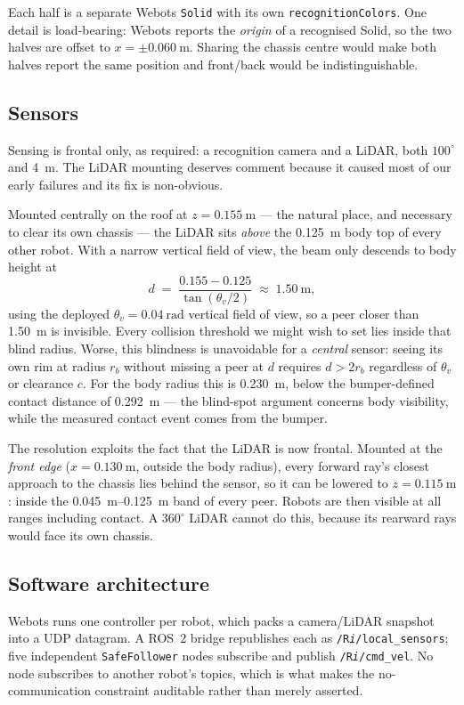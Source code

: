 \documentclass[conference,a4paper]{IEEEtran}
\begin{document}
Each half is a separate Webots \texttt{Solid} with its own
\texttt{recognitionColors}. One detail is load-bearing: Webots reports the
\emph{origin} of a recognised Solid, so the two halves are offset to
$x=\pm\SI{0.060}{\metre}$. Sharing the chassis centre would make both halves
report the same position and front/back would be indistinguishable.

\subsection{Sensors}
Sensing is frontal only, as required: a recognition camera and a LiDAR, both
$100^\circ$ and \SI{4}{\metre}. The LiDAR mounting deserves comment because it
caused most of our early failures and its fix is non-obvious.

Mounted centrally on the roof at $z=\SI{0.155}{\metre}$ --- the natural place,
and necessary to clear its own chassis --- the LiDAR sits \emph{above} the
\SI{0.125}{\metre} body top of every other robot. With a narrow vertical field
of view, the beam only descends to body height at
\begin{equation}
d \;=\; \frac{0.155-0.125}{\tan(\theta_v/2)} \;\approx\; \SI{1.50}{\metre},
\label{eq:blind}
\end{equation}
using the deployed $\theta_v=\SI{0.04}{\radian}$ vertical field of view, so a
peer closer than \SI{1.50}{\metre} is invisible. Every collision
threshold we might wish to set lies inside that blind radius. Worse, this
blindness is unavoidable for a \emph{central} sensor: seeing its own rim at
radius $r_b$ without missing a peer at $d$ requires $d>2r_b$ regardless of
$\theta_v$ or clearance $c$. For the body radius this is \SI{0.230}{\metre},
below the bumper-defined contact distance of \SI{0.292}{\metre} --- the
blind-spot argument concerns body visibility, while the measured contact
event comes from the bumper.

The resolution exploits the fact that the LiDAR is now frontal. Mounted at the
\emph{front edge} ($x=\SI{0.130}{\metre}$, outside the body radius), every
forward ray's closest approach to the chassis lies behind the sensor, so it
can be lowered to $z=\SI{0.115}{\metre}$: inside the \SIrange{0.045}{0.125}{\metre}
band of every peer. Robots are then visible at all ranges including contact.
A $360^\circ$ LiDAR cannot do this, because its rearward rays would face its
own chassis.

\subsection{Software architecture}
Webots runs one controller per robot, which packs a camera/LiDAR snapshot into
a UDP datagram. A ROS~2 bridge republishes each as
\texttt{/R\textit{i}/local\_sensors}; five independent \texttt{SafeFollower}
nodes subscribe and publish \texttt{/R\textit{i}/cmd\_vel}. No node subscribes
to another robot's topics, which is what makes the no-communication constraint
auditable rather than merely asserted.
\end{document}
